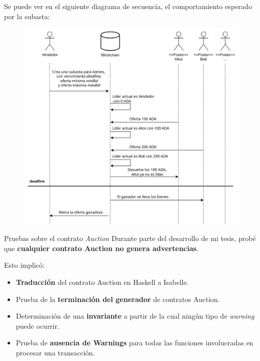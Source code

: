 \documentclass{beamer}
\newcommand{\nologo}{\setbeamertemplate{logo}{}} %
\begin{document}
{\nologo
\begin{frame}

Se puede ver en el siguiente diagrama de secuencia, el comportamiento esperado por la subasta:

\begin{figure}[H]
    \centering
    \includegraphics[height=0.8\textheight]{Auction.png}
\end{figure}

\end{frame}
}

\begin{frame}{Pruebas sobre el contrato \textit{Auction}}
Durante parte del desarrollo de mi tesis, probé que \textbf{cualquier contrato Auction no genera advertencias}.

\vfill
\pause

Esto implicó:

\begin{itemize}
    \item \textbf{Traducción} del contrato Auction en Haskell a Isabelle.
        \pause
    \item Prueba de la \textbf{terminación del generador} de contratos Auction.
        \pause
    \item Determinación de una \textbf{invariante} a partir de la cual ningún tipo de \textit{warning} puede ocurrir.
        \pause
    \item Prueba de \textbf{ausencia de Warnings} para todas las funciones involucradas en procesar una transacción.
\end{itemize}


\end{frame}
\end{document}
